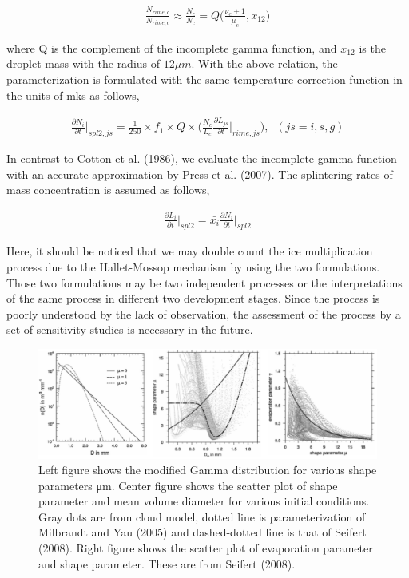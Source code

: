\begin{eqnarray}
\frac{N_{rime,c}}{N_{rime,c}}\approx\frac{N_{c}}{N_{c}}=Q\bigl(\frac{\nu_{c}+1}{\mu_{c}},x_{12}\bigr)\label{sn215}
\end{eqnarray}

where Q is the complement of the incomplete gamma function, and $x_{12}$ is the droplet mass with the radius of $12 \mu m$. With the above relation, the parameterization is formulated with the same temperature correction function in the units of mks as follows,

\begin{eqnarray}
\frac{\partial N_{i}}{\partial t}\Bigr|_{spl2,js}=\frac{1}{250}\times f_{1}\times Q\times\bigl(\frac{N_{c}}{L_{c}}\frac{\partial L_{js}}{\partial t}\Bigr|_{rime,js}\bigr),\;\;(js=i,s,g)\label{sn216}
\end{eqnarray}

In contrast to Cotton et al. (1986), we evaluate the incomplete gamma function with an accurate approximation by Press et al. (2007). The splintering rates of mass concentration is assumed as follows,

\begin{eqnarray}
\frac{\partial L_{i}}{\partial t}\Bigr|_{spl2} = \bar{x_{i}}\frac{\partial N_{i}}{\partial t}\Bigr|_{spl2}\label{sn217}
\end{eqnarray}

Here, it should be noticed that we may double count the ice multiplication process due to the Hallet-Mossop mechanism by using the two formulations. Those two formulations may be two independent processes or the interpretations of the same process in different two development stages. Since the process is poorly understood by the lack of observation, the assessment of the process by a set of sensitivity studies is necessary in the future.

\begin{figure}[]
\begin{center}
\includegraphics[scale=0.75]{./figure/mod_gamma_dist.eps}
\end{center}
\caption{Left figure shows the modified Gamma distribution for various shape parameters μm. Center figure shows the scatter plot of shape parameter and mean volume diameter for various initial conditions. Gray dots are from cloud model, dotted line is parameterization of Milbrandt and Yau (2005) and dashed-dotted line is that of Seifert (2008). Right figure shows the scatter plot of evaporation parameter and shape parameter. These are from Seifert (2008).}
\label{figsn2-17}
\end{figure}

